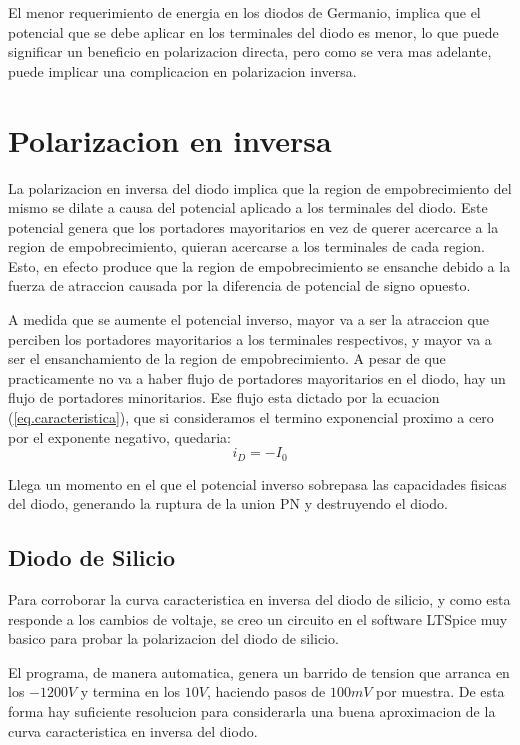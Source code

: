 \documentclass[chaptersright]{informeutn}
\begin{document}
        El menor requerimiento de energia en los diodos de Germanio, implica que el potencial que se debe aplicar en los
        terminales del diodo es menor, lo que puede significar un beneficio en polarizacion directa, pero como se vera
        mas adelante, puede implicar una complicacion en polarizacion inversa.

    \section{Polarizacion en inversa}
      La polarizacion en inversa del diodo implica que la region de empobrecimiento del mismo se dilate a causa del
      potencial aplicado a los terminales del diodo. Este potencial genera que los portadores mayoritarios en vez de
      querer acercarce a la region de empobrecimiento, quieran acercarse a los terminales de cada region. Esto, en
      efecto produce que la region de empobrecimiento se ensanche debido a la fuerza de atraccion causada por la
      diferencia de potencial de signo opuesto.

      A medida que se aumente el potencial inverso, mayor va a ser la atraccion que perciben los portadores
      mayoritarios a los terminales respectivos, y mayor va a ser el ensanchamiento de la region de empobrecimiento.
      A pesar de que practicamente no va a haber flujo de portadores mayoritarios en el diodo, hay un flujo de
      portadores minoritarios. Ese flujo esta dictado por la ecuacion (\ref{eq.caracteristica}), que si consideramos
      el termino exponencial proximo a cero por el exponente negativo, quedaria:
      \begin{equation*}
        i_D = -I_0
      \end{equation*}

      Llega un momento en el que el potencial inverso sobrepasa las capacidades fisicas del diodo, generando la
      ruptura de la union PN y destruyendo el diodo.

      \subsection{Diodo de Silicio}
        Para corroborar la curva caracteristica en inversa del diodo de silicio, y como esta responde a los cambios de
        voltaje, se creo un circuito en el software LTSpice muy basico para probar la polarizacion del diodo de
        silicio.

        El programa, de manera automatica, genera un barrido de tension que arranca en los $-1200V$ y termina en los
        $10V$, haciendo pasos de $100mV$ por muestra. De esta forma hay suficiente resolucion para considerarla una
        buena aproximacion de la curva caracteristica en inversa del diodo.
\end{document}
